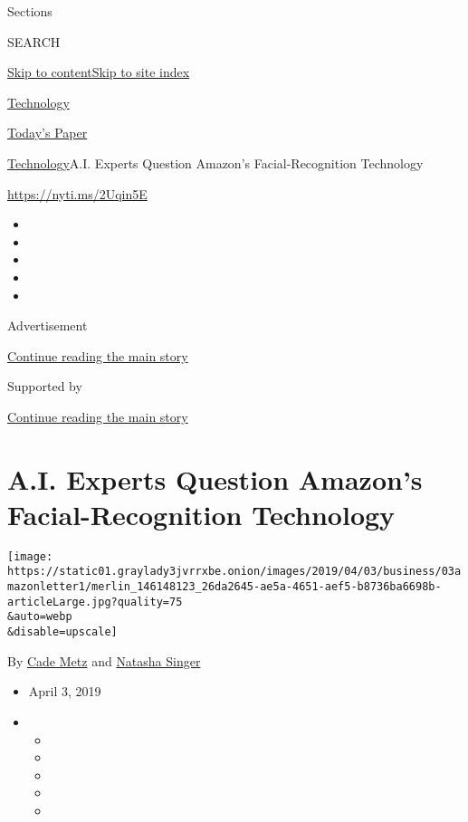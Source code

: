 Sections

SEARCH

\protect\hyperlink{site-content}{Skip to
content}\protect\hyperlink{site-index}{Skip to site index}

\href{https://www.nytimes3xbfgragh.onion/section/technology}{Technology}

\href{https://myaccount.nytimes3xbfgragh.onion/auth/login?response_type=cookie\&client_id=vi}{}

\href{https://www.nytimes3xbfgragh.onion/section/todayspaper}{Today's
Paper}

\href{/section/technology}{Technology}\textbar{}A.I. Experts Question
Amazon's Facial-Recognition Technology

\url{https://nyti.ms/2Uqin5E}

\begin{itemize}
\item
\item
\item
\item
\item
\end{itemize}

Advertisement

\protect\hyperlink{after-top}{Continue reading the main story}

Supported by

\protect\hyperlink{after-sponsor}{Continue reading the main story}

\hypertarget{ai-experts-question-amazons-facial-recognition-technology}{%
\section{A.I. Experts Question Amazon's Facial-Recognition
Technology}\label{ai-experts-question-amazons-facial-recognition-technology}}

\texttt{[image: https://static01.graylady3jvrrxbe.onion/images/2019/04/03/business/03amazonletter1/merlin\_146148123\_26da2645-ae5a-4651-aef5-b8736ba6698b-articleLarge.jpg?quality=75\\\&auto=webp\\\&disable=upscale]}

By \href{https://www.nytimes3xbfgragh.onion/by/cade-metz}{Cade Metz} and
\href{https://www.nytimes3xbfgragh.onion/by/natasha-singer}{Natasha
Singer}

\begin{itemize}
\item
  April 3, 2019
\item
  \begin{itemize}
  \item
  \item
  \item
  \item
  \item
  \end{itemize}
\end{itemize}

